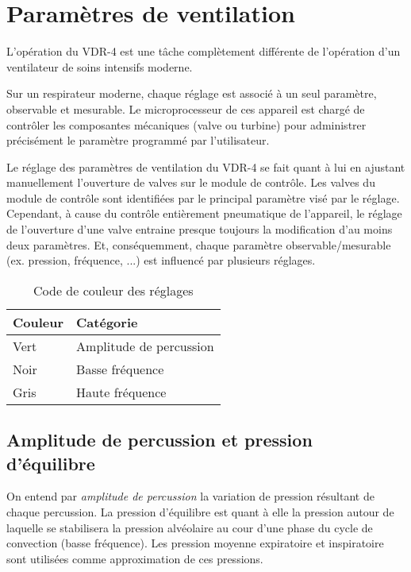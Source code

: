 \def\knobshow#1{ \marginpar{ \centering \begin{tikzpicture} \pic
[scale=1.5] {labeleb=#1}; \end{tikzpicture} }}

\def\param#1{{\small \uppercase{#1}}}

\chapter{Paramètres de ventilation}

L'opération du VDR-4 est une tâche complètement différente de
l'opération d'un ventilateur de soins intensifs moderne.

Sur un respirateur moderne, chaque réglage est associé à un seul
paramètre, observable et mesurable. Le microprocesseur de ces appareil
est chargé de contrôler les composantes mécaniques (valve ou turbine)
pour administrer précisément le paramètre programmé par l'utilisateur.

Le réglage des paramètres de ventilation du VDR-4 se fait quant à lui
en ajustant manuellement l'ouverture de valves sur le module de
contrôle.  Les valves du module de contrôle sont identifiées par le
principal paramètre visé par le réglage.  Cependant, à cause du
contrôle entièrement pneumatique de l'appareil, le réglage de
l'ouverture d'une valve entraine presque toujours la modification d'au
moins deux paramètres. Et, conséquemment, chaque paramètre
observable/mesurable (ex. pression, fréquence, ...) est influencé par
plusieurs réglages.

\begin{table}[h] \centering \caption{Code de couleur des réglages}
	\begin{tabular}{ll} \hline Couleur & Catégorie \\ \hline Vert &
		Amplitude de percussion\\ Noir & Basse fréquence\\ Gris & Haute
		fréquence\\ \hline \end{tabular} \end{table}

\section{Amplitude de percussion et pression d'équilibre}

On entend par	\emph{amplitude de percussion} la variation de pression
	résultant de chaque percussion. La pression d'équilibre est quant à
	elle la pression autour de laquelle se stabilisera la pression
	alvéolaire au cour d'une phase du cycle de convection (basse
	fréquence). Les pression moyenne expiratoire et inspiratoire sont
	utilisées comme approximation de ces pressions.

